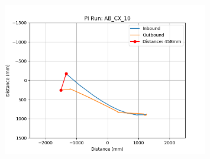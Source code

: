 \documentclass[a4paper,11pt,twoside,openright]{article}
\begin{document}
\begin{figure}[h!]
  \centering
  \includegraphics[width=0.8\textwidth]{AB_CX_10}
  \caption{\label{fig:abcx10}}
\end{figure}
\end{document}
